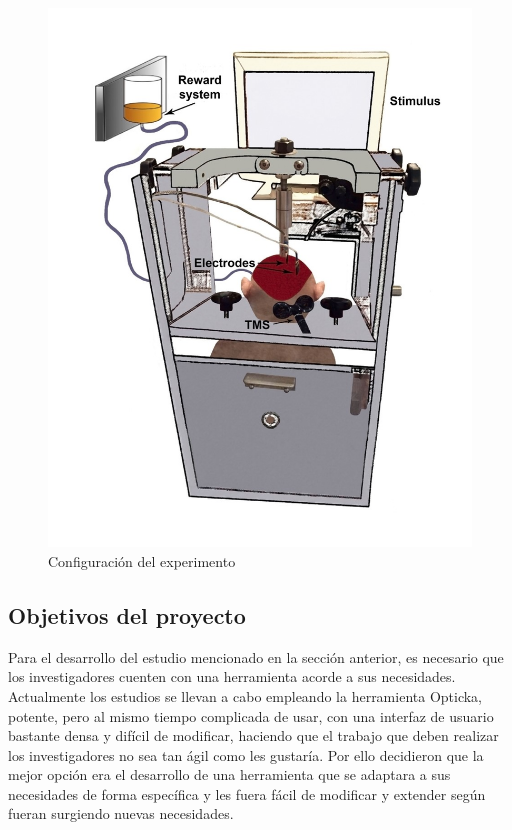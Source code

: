 \documentclass[conference]{IEEEtran}
\begin{document}
\begin{figure}[htbp]
\centerline{\includegraphics[width=\linewidth]{figures/mono}}
\caption{Configuración del experimento}
\label{figMono}
\end{figure}
\subsection{Objetivos del proyecto}

Para el desarrollo del estudio mencionado en la sección anterior, es necesario que los investigadores cuenten con una herramienta acorde a sus necesidades. Actualmente los estudios se llevan a cabo empleando la herramienta Opticka, potente, pero al mismo tiempo complicada de usar, con una interfaz de usuario bastante densa y difícil de modificar, haciendo que el trabajo que deben realizar los investigadores no sea tan ágil como les gustaría. Por ello decidieron que la mejor opción era el desarrollo de una herramienta que se adaptara a sus necesidades de forma específica y les fuera fácil de modificar y extender según fueran surgiendo nuevas necesidades.
\end{document}
